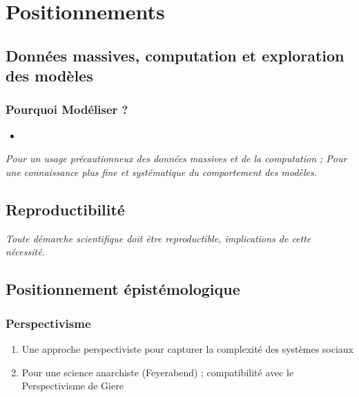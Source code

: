 


\section{Positionnements}



\subsection{Données massives, computation et exploration des modèles}


\subsubsection{Pourquoi Modéliser ?}

\begin{itemize}
	\item 
\end{itemize}

\textit{Pour un usage précautionneux des données massives et de la computation ; Pour une connaissance plus fine et systématique du comportement des modèles.}



\subsection{Reproductibilité}

\textit{Toute démarche scientifique doit être reproductible, implications de cette nécessité.}





\subsection{Positionnement épistémologique}

\subsubsection{Perspectivisme}

\begin{enumerate}
	\item Une approche perspectiviste pour capturer la complexité des systèmes sociaux
	\item Pour une science anarchiste (Feyerabend) ; compatibilité avec le Perspectivisme de Giere
\end{enumerate}

